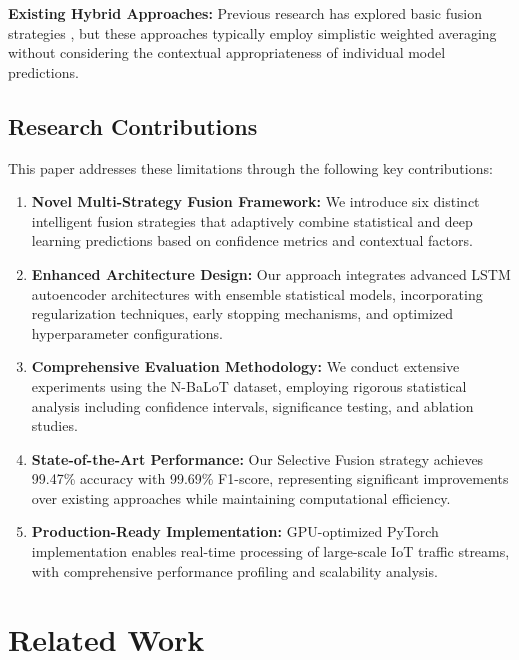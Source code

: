 \documentclass[conference]{IEEEtran}
\begin{document}
\textbf{Existing Hybrid Approaches:} Previous research has explored basic fusion strategies \cite{chen2019fusion}, but these approaches typically employ simplistic weighted averaging without considering the contextual appropriateness of individual model predictions.

\subsection{Research Contributions}

This paper addresses these limitations through the following key contributions:

\begin{enumerate}
\item \textbf{Novel Multi-Strategy Fusion Framework:} We introduce six distinct intelligent fusion strategies that adaptively combine statistical and deep learning predictions based on confidence metrics and contextual factors.

\item \textbf{Enhanced Architecture Design:} Our approach integrates advanced LSTM autoencoder architectures with ensemble statistical models, incorporating regularization techniques, early stopping mechanisms, and optimized hyperparameter configurations.

\item \textbf{Comprehensive Evaluation Methodology:} We conduct extensive experiments using the N-BaLoT dataset, employing rigorous statistical analysis including confidence intervals, significance testing, and ablation studies.

\item \textbf{State-of-the-Art Performance:} Our Selective Fusion strategy achieves 99.47\% accuracy with 99.69\% F1-score, representing significant improvements over existing approaches while maintaining computational efficiency.

\item \textbf{Production-Ready Implementation:} GPU-optimized PyTorch implementation enables real-time processing of large-scale IoT traffic streams, with comprehensive performance profiling and scalability analysis.
\end{enumerate}

\section{Related Work}
\end{document}
